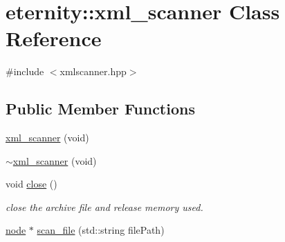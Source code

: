 \hypertarget{classeternity_1_1xml__scanner}{}\section{eternity\+:\+:xml\+\_\+scanner Class Reference}
\label{classeternity_1_1xml__scanner}


{\ttfamily \#include $<$xmlscanner.\+hpp$>$}

\subsection*{Public Member Functions}
\begin{DoxyCompactItemize}
\item 
\hyperlink{classeternity_1_1xml__scanner_aada242623cfe6db20f8c37a8e8f65860}{xml\+\_\+scanner} (void)
\item 
\hyperlink{classeternity_1_1xml__scanner_a32ad22476378295dddbc6e6632087111}{$\sim$xml\+\_\+scanner} (void)
\item 
void \hyperlink{classeternity_1_1xml__scanner_a7ea884c9c01bd7efe14c49c341b07757}{close} ()
\begin{DoxyCompactList}\small\item\em close the archive file and release memory used. \end{DoxyCompactList}\item 
\hyperlink{classeternity_1_1node}{node} $\ast$ \hyperlink{classeternity_1_1xml__scanner_adacdcc2fe2a312411ac59ed6760d9c83}{scan\+\_\+file} (std\+::string file\+Path)
\end{DoxyCompactItemize}

